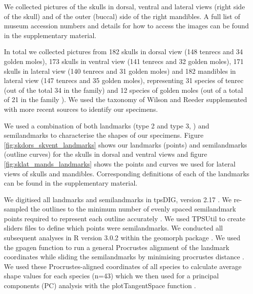 \documentclass[12pt,a4paper]{article}
\begin{document}
	We collected pictures of the skulls in dorsal, ventral and lateral views (right side of the skull) and of the outer (buccal) side of the right mandibles. A full list of museum accession numbers and details for how to access the images can be found in the supplementary material.

	In total we collected pictures from 182 skulls in dorsal view (148 tenrecs and 34 golden moles), 173 skulls in ventral view (141 tenrecs and 32 golden moles), 171 skulls in lateral view (140 tenrecs and 31 golden moles)   and 182 mandibles in lateral view (147 tenrecs and 35 golden moles), representing 31 species of tenrec (out of the total 34 in the family) and 12 species of golden moles (out of a total of 21 in the family \citep{Asher2010}). %
	We used the taxonomy of Wilson and Reeder \citeyearpar{Wilson2005} supplemented with more recent sources \citep{IUCN2012, Olson2013} to identify our specimens. 
	

	We used a combination of both landmarks (type 2 and type 3, \citep{Zelditch2012}) and semilandmarks to characterise the shapes of our specimens. Figure \ref{fig:skdors_skvent_landmarks} shows our landmarks (points) and semilandmarks (outline curves) for the skulls in dorsal and ventral views and figure \ref{fig:sklat_mands_landmarks} shows the points and curves we used for lateral views of skulls and mandibles. Corresponding definitions of each of the landmarks can be found in the supplementary material.
	
	

	We digitised all landmarks and semilandmarks in tpsDIG, version 2.17 \citep{Rohlf2013}. We re-sampled the outlines to the minimum number of evenly spaced semilandmark points required to represent each outline accurately \citep[][details in supplementary material]{MacLeod2013}. We used TPSUtil \citep{Rohlf2012} to create sliders files \citep{Zelditch2012} to define which points were semilandmarks. We conducted all subsequent analyses in R version 3.0.2 \citep{Team2014} within the geomorph package \citep{Adams2013}. We used the gpagen function to run a general Procrustes alignment \citep{Rohlf1993} of the landmark coordinates while sliding the semilandmarks by minimising procrustes distance \citep{Bookstein1997}. We used these Procrustes-aligned coordinates of all species to calculate average shape values for each species (n=43) which we then used for a principal components (PC) analysis with the plotTangentSpace function \citep{Adams2013}. 
\end{document}
